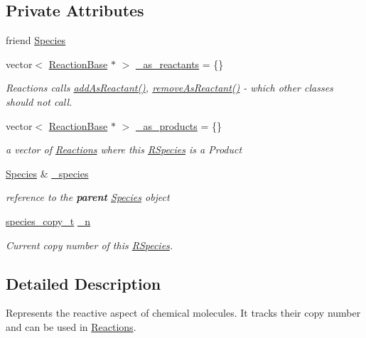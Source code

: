 \subsection*{Private Attributes}
\begin{DoxyCompactItemize}
\item 
friend \hyperlink{classRSpecies_a533594d731cf6ec10a4d7321b1213cc5}{Species}
\item 
vector$<$ \hyperlink{classReactionBase}{Reaction\+Base} $\ast$ $>$ \hyperlink{classRSpecies_a231c4835e7367ffdb405a1463a7f8170}{\+\_\+as\+\_\+reactants} = \{\}
\begin{DoxyCompactList}\small\item\em Reactions calls \hyperlink{classRSpecies_a6e52bc2409c55b706197b2e48323aff2}{add\+As\+Reactant()}, \hyperlink{classRSpecies_a3abaae1f77fc3cd47eb77926b7f26828}{remove\+As\+Reactant()} -\/ which other classes should not call. \end{DoxyCompactList}\item 
vector$<$ \hyperlink{classReactionBase}{Reaction\+Base} $\ast$ $>$ \hyperlink{classRSpecies_a166eef547a69e4c03f5a8390b5f0686b}{\+\_\+as\+\_\+products} = \{\}
\begin{DoxyCompactList}\small\item\em a vector of \hyperlink{classReaction}{Reactions} where this \hyperlink{classRSpecies}{R\+Species} is a Product \end{DoxyCompactList}\item 
\hyperlink{classSpecies}{Species} \& \hyperlink{classRSpecies_a884cfd77555cd6f783ef95289a87f8a5}{\+\_\+species}
\begin{DoxyCompactList}\small\item\em reference to the {\bfseries parent} \hyperlink{classSpecies}{Species} object \end{DoxyCompactList}\item 
\hyperlink{common_8h_a3503f321fd36304ee274141275cca586}{species\+\_\+copy\+\_\+t} \hyperlink{classRSpecies_a3c247ef50a25db875d0f657e6a2505ca}{\+\_\+n}
\begin{DoxyCompactList}\small\item\em Current copy number of this \hyperlink{classRSpecies}{R\+Species}. \end{DoxyCompactList}\end{DoxyCompactItemize}


\subsection{Detailed Description}
Represents the reactive aspect of chemical molecules. It tracks their copy number and can be used in \hyperlink{classReaction}{Reactions}. 

